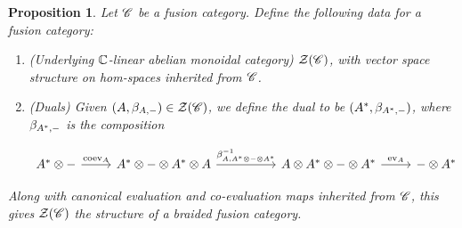 \documentclass{article}
\newtheorem{proposition}{Proposition}[section]
\theoremstyle{definition}
\numberwithin{figure}{section}
\begin{document}
\begin{proposition} Let $\mathscr{C}$ be a fusion category. Define the following data for a fusion category:

\begin{enumerate}
\item (Underlying $\mathbb{C}$-linear abelian monoidal category) $\mathcal{Z}(\mathscr{C})$, with vector space structure on hom-spaces inherited from $\mathscr{C}$.

\item (Duals) Given $(A,\beta_{A,\--})\in \mathcal{Z}(\mathscr{C})$, we define the dual to be $(A^*,\beta_{A^*,\--})$, where $\beta_{A^*,\--}$ is the composition

\[\begin{tikzcd}
	{A^*\otimes \--} & {A^*\otimes \-- \otimes A^*\otimes A} && {A\otimes A^*\otimes \-- \otimes A^*} & {\--\otimes A^*}
	\arrow["{\ev_A}", from=1-4, to=1-5]
	\arrow["{\coev_{A}}", from=1-1, to=1-2]
	\arrow["{\beta^{-1}_{A,A^*\otimes \-- \otimes A^*}}", from=1-2, to=1-4]
\end{tikzcd}\]
\end{enumerate}

Along with canonical evaluation and co-evaluation maps inherited from $\mathscr{C}$, this gives $\mathcal{Z}(\mathscr{C})$ the structure of a braided fusion category.
\end{proposition}
\end{document}
